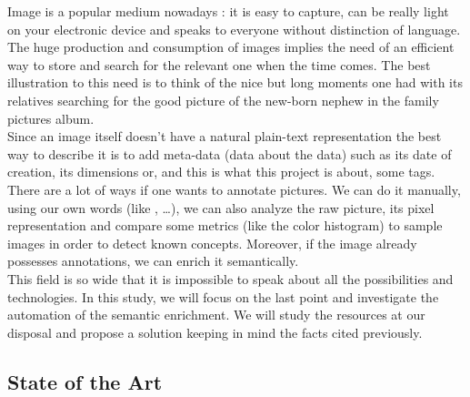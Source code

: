 Image is a popular medium nowadays : it is easy to capture, can be really light on your electronic device and speaks to everyone without distinction of language.\\
The huge production and consumption of images implies the need of an efficient way to store and search for the relevant one when the time comes. The best illustration to this need is to think of the nice but long moments one had with its relatives searching for the good picture of the new-born nephew in the family pictures album.\\
Since an image itself doesn't have a natural plain-text representation the best way to describe it is to add meta-data (data about the data) such as its date of creation, its dimensions or, and this is what this project is about, some tags.\\
There are a lot of ways if one wants to annotate pictures. We can do it manually, using our own words (like ,  \dots), we can also analyze the raw picture, its pixel representation and compare some metrics (like the color histogram) to sample images in order to detect known concepts. Moreover, if the image already possesses annotations, we can enrich it semantically. \\
This field is so wide that it is impossible to speak about all the possibilities and technologies. In this study, we will focus on the last point and investigate the automation of the semantic enrichment. We will study the resources at our disposal and propose a solution keeping in mind the facts cited previously.

\subsection{State of the Art} %
\label{sub:state_of_the_art}

